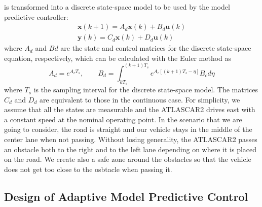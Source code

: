 \documentclass[conference, 11pt]{IEEEtran}
\begin{document}
is transformed into a discrete state-space model to be used by the model predictive controller:
\begin{equation}
\label{eqn:dynamics_ss_obstacle_avoidance_dis}
	\begin{array}{rr}
	{\textbf{x}}(k+1) =A_d \textbf{x}(k)+ B_d \textbf{u}(k)\\
	\textbf{y}(k) =C_d \textbf{x}(k) + D_d \textbf{u}(k)
	\end{array}
\end{equation}
where $A_d$ and $B d$ are the state and control matrices for the discrete state-space equation, respectively, which can be calculated with the Euler method as
\[
A_d = e^{A_cT_s},\qquad B_d = \int_{kT_s}^{(k+1)T_s} e^{A_c[(k+1)T_s-\eta]}B_c d\eta
\]
where $T_s$ is the sampling interval for the discrete state-space model. The matrices $C_d$ and $D_d$ are equivalent to those in the continuous case. For simplicity, we assume that all the states are measurable and the ATLASCAR2 drives east with a constant speed at the nominal operating point. In the scenario that we are going to consider, the road is straight and our vehicle stays in the middle of the center lane when not passing. Without losing generality, the ATLASCAR2 passes an obstacle both to the right and to the left lane depending on where it is placed on the road. We create also a safe zone around the obstacles so that the vehicle does not get too close to the osbtacle when passing it.

\subsection{Design of Adaptive Model Predictive Control}
\end{document}
